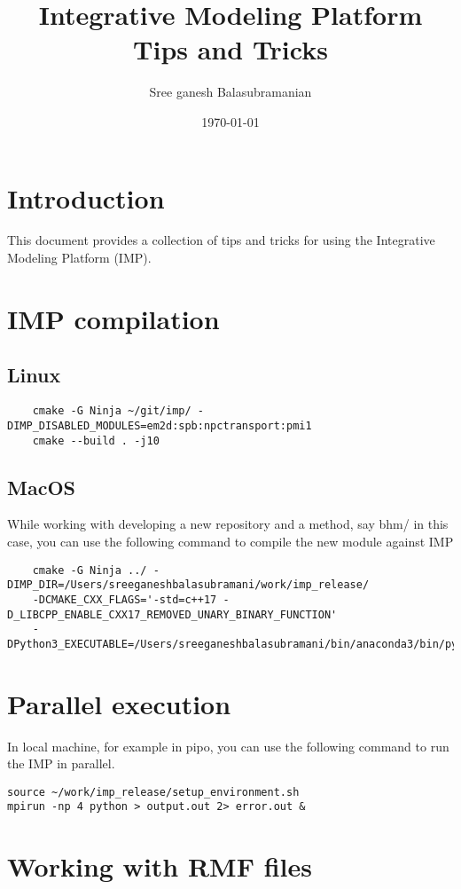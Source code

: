 \documentclass{article}
\title{Integrative Modeling Platform Tips and Tricks}
\author{Sree ganesh Balasubramanian}
\date{\today}
\begin{document}
\maketitle

\section{Introduction}
This document provides a collection of tips and tricks for using the Integrative Modeling Platform (IMP).

\section{IMP compilation}
\subsection{Linux}
\begin{verbatim}
    cmake -G Ninja ~/git/imp/ -DIMP_DISABLED_MODULES=em2d:spb:npctransport:pmi1
    cmake --build . -j10
\end{verbatim}
\subsection{MacOS}
While working with developing a new repository and a method, say bhm/ in this case, \cite{Author1999}
you can use the following command to compile the new module against IMP 
\begin{verbatim}
    cmake -G Ninja ../ -DIMP_DIR=/Users/sreeganeshbalasubramani/work/imp_release/ 
    -DCMAKE_CXX_FLAGS='-std=c++17 -D_LIBCPP_ENABLE_CXX17_REMOVED_UNARY_BINARY_FUNCTION' 
    -DPython3_EXECUTABLE=/Users/sreeganeshbalasubramani/bin/anaconda3/bin/python
\end{verbatim}
\section{Parallel execution}
In local machine, for example in pipo, you can use the following command to run the IMP in parallel.
\begin{verbatim}
source ~/work/imp_release/setup_environment.sh
mpirun -np 4 python > output.out 2> error.out &
\end{verbatim}

\section{Working with RMF files}
\end{document}
